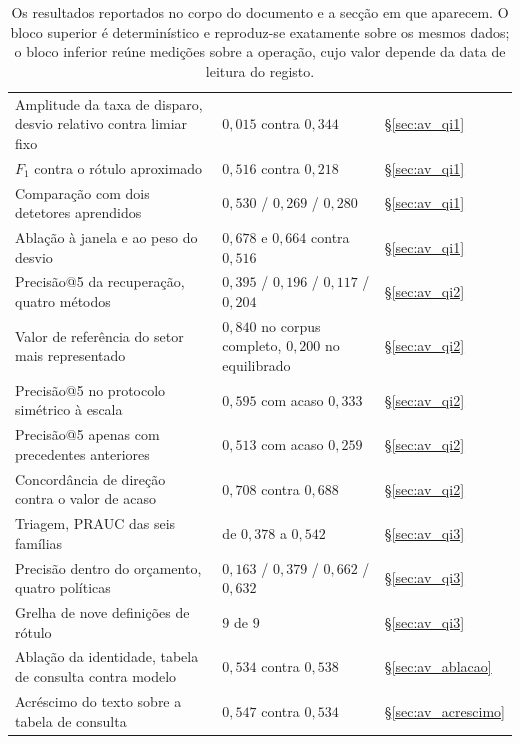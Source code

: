 \begin{table}[!htbp]
\caption[Cada resultado e o procedimento que o produz]{Os resultados reportados no corpo do
documento e a secção em que aparecem. O bloco superior é determinístico e reproduz-se exatamente
sobre os mesmos dados; o bloco inferior reúne medições sobre a operação, cujo valor depende da data
de leitura do registo.}
\label{tab:ap_numeros}
\centering
\small
\begin{tabular}{p{} L{0.21\textwidth} L{0.19\textwidth}}
\toprule
{} &  &  \\
\midrule
Amplitude da taxa de disparo, desvio relativo contra limiar fixo & $0{,}015$ contra $0{,}344$ &
§\ref{sec:av_qi1} \\
$F_1$ contra o rótulo aproximado & $0{,}516$ contra $0{,}218$ & §\ref{sec:av_qi1} \\
Comparação com dois detetores aprendidos & $0{,}530$ / $0{,}269$ / $0{,}280$ & §\ref{sec:av_qi1} \\
Ablação à janela e ao peso do desvio & $0{,}678$ e $0{,}664$ contra $0{,}516$ & §\ref{sec:av_qi1} \\
\addlinespace
Precisão@5 da recuperação, quatro métodos & $0{,}395$ / $0{,}196$ / $0{,}117$ / $0{,}204$ &
§\ref{sec:av_qi2} \\
Valor de referência do setor mais representado & $0{,}840$ no corpus completo, $0{,}200$ no equilibrado & §\ref{sec:av_qi2} \\
Precisão@5 no protocolo simétrico à escala & $0{,}595$ com acaso $0{,}333$ & §\ref{sec:av_qi2} \\
Precisão@5 apenas com precedentes anteriores & $0{,}513$ com acaso $0{,}259$ & §\ref{sec:av_qi2} \\
Concordância de direção contra o valor de acaso & $0{,}708$ contra $0{,}688$ & §\ref{sec:av_qi2} \\
\addlinespace
Triagem, \gls{PRAUC} das seis famílias & de $0{,}378$ a $0{,}542$ & §\ref{sec:av_qi3} \\
Precisão dentro do orçamento, quatro políticas & $0{,}163$ / $0{,}379$ / $0{,}662$ / $0{,}632$ &
§\ref{sec:av_qi3} \\
Grelha de nove definições de rótulo & $9$ de $9$ & §\ref{sec:av_qi3} \\
Ablação da identidade, tabela de consulta contra modelo & $0{,}534$ contra $0{,}538$ &
§\ref{sec:av_ablacao} \\
Acréscimo do texto sobre a tabela de consulta & $0{,}547$ contra $0{,}534$ & §\ref{sec:av_acrescimo} \\

\end{tabular}
\end{table}
